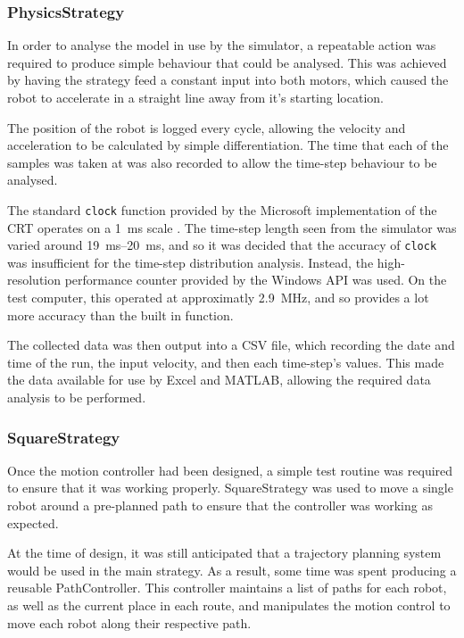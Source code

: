 \documentclass[10pt]{article}
\begin{document}
\subsubsection{PhysicsStrategy}

In order to analyse the model in use by the simulator, a repeatable
action was required to produce simple behaviour that could be analysed.  This
was achieved by having the strategy feed a constant input into both motors,
which caused the robot to accelerate in a straight line away from it's starting
location.

The position of the robot is logged every cycle, allowing the velocity and
acceleration to be calculated by simple differentiation.  The time that each of
the samples was taken at was also recorded to allow the time-step behaviour to be
analysed.

The standard \texttt{clock} function provided by the Microsoft implementation of
the CRT operates on a \SI{1}{\milli\second} scale \cite{windowsSDK}.  The
time-step length seen from the simulator was varied around
\SIrange{19}{20}{\milli\second}, and so it was decided that the accuracy of
\texttt{clock} was insufficient for the time-step distribution analysis.
Instead, the high-resolution performance counter provided by the Windows API was
used.  On the test computer, this operated at approximatly
\SI{2.9}{\mega\hertz}, and so provides a lot more accuracy than the built in
function.  

The collected data was then output into a CSV file, which recording the
date and time of the run, the input velocity, and then each time-step's values. 
This made the data available for use by Excel and MATLAB, allowing the required
data analysis to be performed.

\subsubsection{SquareStrategy}

Once the motion controller had been designed, a simple test routine was required
to ensure that it was working properly.  SquareStrategy was used to move a
single robot around a pre-planned path to ensure that the controller was working
as expected.

At the time of design, it was still anticipated that a trajectory planning
system would be used in the main strategy.  As a result, some time was spent
producing a reusable PathController.  This controller maintains a list of paths
for each robot, as well as the current place in each route, and manipulates the
motion control to move each robot along their respective path.
\end{document}

